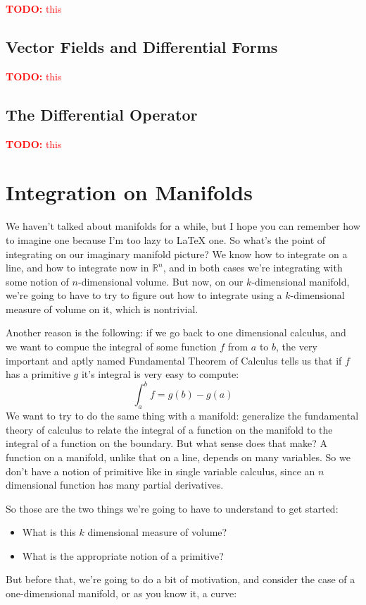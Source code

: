 \documentclass{article}
\newcommand{\reals}[0]{\mathbb{R}}
\newcommand{\TODO}[1]{\textcolor{red}{\textbf{TODO:} #1}}
\begin{document}
\TODO{this}

\subsection{Vector Fields and Differential Forms}

\TODO{this}

\subsection{The Differential Operator}

\TODO{this}

\section{Integration on Manifolds}

We haven't talked about manifolds for a while, but I hope you can remember how to imagine one because I'm too lazy to {\LaTeX} one. So what's the point of integrating on our imaginary manifold picture? We know how to integrate on a line, and how to integrate now in \(\reals^n\), and in both cases we're integrating with some notion of \(n\)-dimensional volume. But now, on our \(k\)-dimensional manifold, we're going to have to try to figure out how to integrate using a \(k\)-dimensional measure of volume on it, which is nontrivial.

Another reason is the following: if we go back to one dimensional calculus, and we want to compue the integral of some function \(f\) from \(a\) to \(b\), the very important and aptly named Fundamental Theorem of Calculus tells us that if \(f\) has a primitive \(g\) it's integral is very easy to compute:
\begin{equation}
  \int_a^bf = g(b) - g(a)
\end{equation}
We want to try to do the same thing with a manifold: generalize the fundamental theory of calculus to relate the integral of a function on the manifold to the integral of a function on the boundary. But what sense does that make? A function on a manifold, unlike that on a line, depends on many variables. So we don't have a notion of primitive like in single variable calculus, since an \(n\) dimensional function has many partial derivatives.

So those are the two things we're going to have to understand to get started:
\begin{itemize}
  \item What is this \(k\) dimensional measure of volume?
  \item What is the appropriate notion of a primitive?
\end{itemize}
But before that, we're going to do a bit of motivation, and consider the case of a one-dimensional manifold, or as you know it, a curve:
\end{document}
